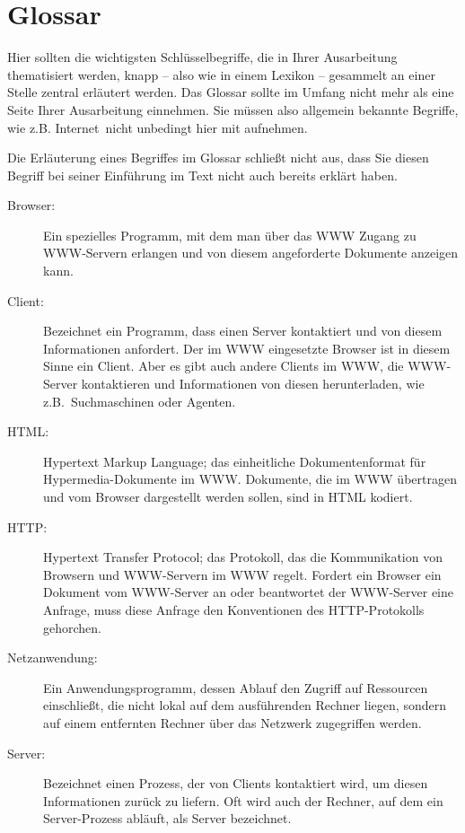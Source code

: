 \section{Glossar} %

Hier sollten die wichtigsten Schlüsselbegriffe, die in Ihrer Ausarbeitung thematisiert werden, knapp -- also wie in einem Lexikon -- gesammelt an einer Stelle zentral erläutert werden.
Das Glossar sollte im Umfang nicht mehr als eine Seite Ihrer Ausarbeitung einnehmen.
Sie müssen also allgemein bekannte Begriffe, wie z.B. \glqq Internet\grqq\, nicht unbedingt hier mit aufnehmen.

Die Erläuterung eines Begriffes im Glossar schließt nicht aus, dass Sie diesen Begriff bei seiner Einführung im Text nicht auch bereits erklärt haben. 


\begin{description}
\item[Browser:] Ein spezielles Programm, mit dem man über das WWW Zugang zu WWW-Servern erlangen und von diesem angeforderte Dokumente anzeigen kann.

\item[Client:] Bezeichnet ein Programm, dass einen Server kontaktiert und von diesem Informationen anfordert. Der im WWW eingesetzte Browser ist in diesem Sinne ein Client. Aber es gibt auch andere Clients im WWW, die WWW-Server kontaktieren und Informationen von diesen herunterladen, wie z.B.~Suchmaschinen oder Agenten.

\item[HTML:] Hypertext Markup Language; das einheitliche Dokumentenformat für Hyper\-media-Dokumente im WWW. Dokumente, die im WWW übertragen und vom Browser dargestellt werden sollen, sind in HTML kodiert.

\item[HTTP:] Hypertext Transfer Protocol; das Protokoll, das die Kommunikation von Browsern und WWW-Servern im WWW regelt. Fordert ein Browser ein Dokument vom WWW-Server an oder beantwortet der WWW-Server eine Anfrage, muss diese Anfrage den Konventionen des HTTP-Protokolls gehorchen. 

\item[Netzanwendung:] Ein Anwendungsprogramm, dessen Ablauf den Zugriff auf Ressourcen einschließt, die nicht lokal auf dem ausführenden Rechner liegen, sondern auf einem entfernten Rechner über das Netzwerk zugegriffen werden. 

\item[Server:] Bezeichnet einen Prozess, der von Clients kontaktiert wird, um diesen Informationen zurück zu liefern.
Oft wird auch der Rechner, auf dem ein Server-Prozess abläuft, als Server bezeichnet.
\end{description}


